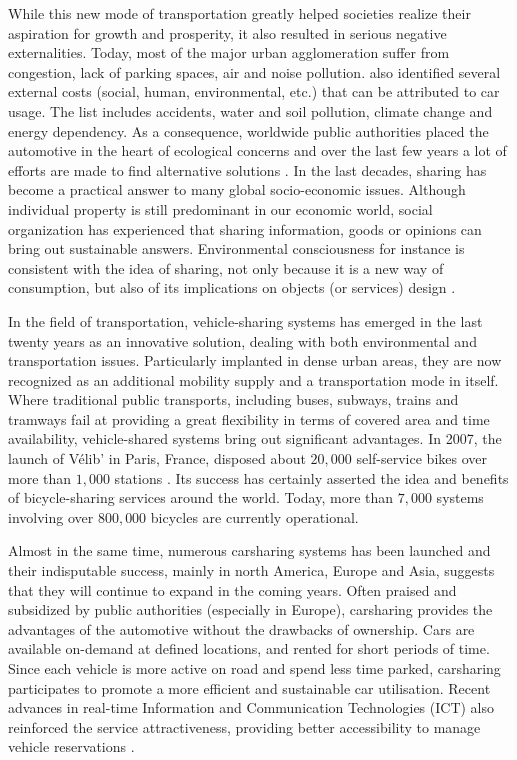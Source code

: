 \begin{bibunit}[ieeetr]
\medskip
While this new mode of transportation greatly helped societies realize their aspiration for growth and prosperity, it also resulted in serious negative externalities.
Today, most of the major urban agglomeration suffer from congestion, lack of parking spaces, air and noise pollution.
\cite{maibach_handbook_2007} also identified several external costs (social, human, environmental, etc.) that can be attributed to car usage.
The list includes accidents, water and soil pollution, climate change and energy dependency.
As a consequence, worldwide public authorities placed the automotive in the heart of ecological concerns and over the last few years a lot of efforts are made to find alternative solutions \cite{mitchell_reinventing_2010}.
In the last decades, sharing has become a practical answer to many global socio-economic issues.
Although individual property is still predominant in our economic world, social organization has experienced that sharing information, goods or opinions can bring out sustainable answers.
Environmental consciousness for instance is consistent with the idea of sharing, not only because it is a new way of consumption, but also of its implications on objects (or services) design \cite{ciari_sharing_2012}.

\medskip
In the field of transportation, vehicle-sharing systems has emerged in the last twenty years as an innovative solution, dealing with both environmental and transportation issues.
Particularly implanted in dense urban areas, they are now recognized as an additional mobility supply and a transportation mode in itself.
Where traditional public transports, including buses, subways, trains and tramways fail at providing a great  flexibility in terms of covered area and time availability, vehicle-shared systems bring out significant advantages.
In 2007, the launch of V{\'e}lib' in Paris, France, disposed about $20,000$ self-service bikes over more than $1,000$ stations \cite{laporte_shared_2015}.
Its success has certainly asserted the idea and benefits of bicycle-sharing services around the world.
Today, more than $7,000$ systems involving over $800,000$ bicycles are currently operational.

Almost in the same time, numerous carsharing systems has been launched and their indisputable success, mainly in north America, Europe and Asia, suggests that they will continue to expand in the coming years.
Often praised and subsidized by public authorities (especially in Europe), carsharing provides the advantages of the automotive without the drawbacks of ownership.
Cars are available on-demand at defined locations, and rented for short periods of time.
Since each vehicle is more active on road and spend less time parked, carsharing participates to promote a more efficient and sustainable car utilisation.
Recent advances in real-time Information and Communication Technologies (ICT) also reinforced the service attractiveness, providing better accessibility to manage vehicle reservations \cite{jorge_carsharing_2013}.



\end{bibunit}

